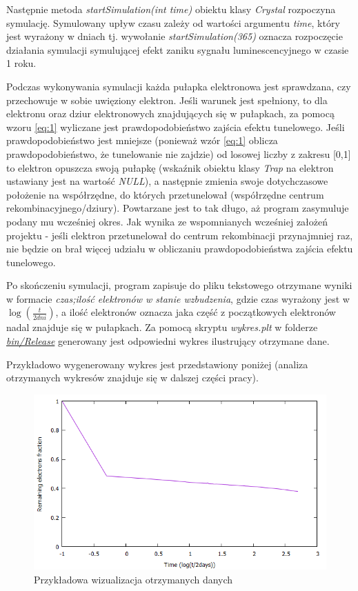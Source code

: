 Następnie metoda \textit{startSimulation(int time)} obiektu klasy \textit{Crystal} rozpoczyna symulację. Symulowany upływ czasu  zależy od wartości argumentu \textit{time}, który jest wyrażony w dniach tj. wywołanie \emph{startSimulation(365)} oznacza rozpoczęcie działania symulacji symulującej efekt zaniku sygnału luminescencyjnego w czasie 1 roku.

Podczas wykonywania symulacji każda pułapka elektronowa jest sprawdzana, czy przechowuje w sobie uwięziony elektron. Jeśli warunek jest spełniony, to dla elektronu oraz dziur elektronowych znajdujących się w pułapkach, za pomocą wzoru \ref{eq:1} wyliczane jest prawdopodobieństwo zajścia efektu tunelowego. Jeśli prawdopodobieństwo jest mniejsze (ponieważ wzór \ref{eq:1} oblicza prawdopodobieństwo, że tunelowanie nie zajdzie) od losowej liczby z zakresu [0,1] to elektron opuszcza swoją pułapkę (wskaźnik obiektu klasy \textit{Trap} na elektron ustawiany jest na wartość \textit{NULL}), a następnie zmienia swoje dotychczasowe położenie na współrzędne, do których przetunelował (współrzędne centrum rekombinacyjnego/dziury). Powtarzane jest to tak długo, aż program zasymuluje podany mu wcześniej okres.  Jak wynika ze wspomnianych wcześniej założeń projektu - jeśli elektron przetunelował do centrum rekombinacji przynajmniej raz, nie będzie on brał więcej udziału w obliczaniu prawdopodobieństwa zajścia efektu tunelowego. 

Po skończeniu symulacji, program zapisuje do pliku tekstowego otrzymane wyniki w formacie \textit{czas;ilość elektronów w stanie wzbudzenia}, gdzie czas wyrażony jest w $ \log(\frac{t}{2 dni}) $, a ilość elektronów oznacza jaka część z początkowych elektronów nadal znajduje się w pułapkach. Za pomocą skryptu \textit{wykres.plt}
w folderze \href{https://github.com/Sharkuu/Dissertation/tree/master/bin/Release}{\textit{bin/Release}} generowany jest odpowiedni wykres ilustrujący otrzymane dane. 

Przykładowo wygenerowany wykres jest przedstawiony poniżej (analiza otrzymanych wykresów znajduje się w dalszej części pracy).

\begin{figure}[H]
\centering
\includegraphics[width=15cm]{wykres1}
\caption{Przykładowa wizualizacja otrzymanych danych}
\label{fig:example}
\end{figure}

